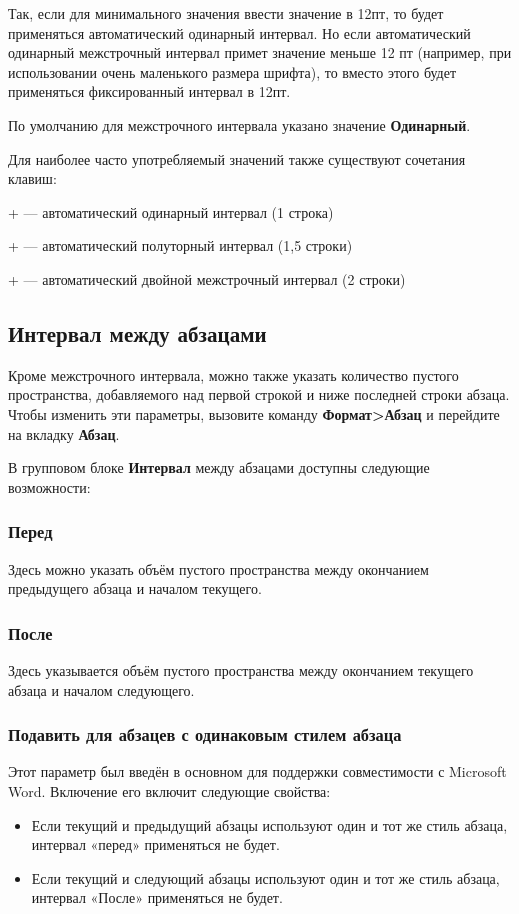 \documentclass[a4paper,10pt]{article}
\begin{document}
\begin{itemize}
Так, если для минимального значения ввести значение в 12пт, то будет применяться автоматический одинарный интервал. Но если автоматический одинарный межстрочный интервал примет значение меньше 12 пт (например, при использовании очень маленького размера шрифта), то вместо этого будет применяться фиксированный интервал в 12пт.
\end{itemize}

По умолчанию для межстрочного интервала указано значение \textbf{Одинарный}.

Для наиболее часто употребляемый значений также существуют сочетания клавиш:

+ --- автоматический одинарный интервал (1 строка)

+ --- автоматический полуторный интервал (1,5 строки)

+ --- автоматический двойной межстрочный интервал (2 строки)

\subsection{Интервал между абзацами}
Кроме межстрочного интервала, можно также указать количество пустого пространства, добавляемого над первой строкой и ниже последней строки абзаца.  
Чтобы изменить эти параметры, вызовите команду \textbf{Формат>Абзац} и перейдите на вкладку \textbf{Абзац}.

В групповом блоке \textbf{Интервал} между абзацами доступны следующие возможности: 

\subsubsection{Перед}
Здесь можно указать объём пустого пространства между окончанием предыдущего абзаца и началом текущего. 

\subsubsection{После}
Здесь указывается объём пустого пространства между окончанием текущего абзаца и началом следующего. 

\subsubsection{Подавить для абзацев с одинаковым стилем абзаца}
Этот параметр был введён в основном для поддержки совместимости с Microsoft Word. Включение его включит следующие свойства:
\begin{itemize}
 \item Если текущий и предыдущий абзацы используют один и тот же стиль абзаца, интервал «перед» применяться не будет.
 \item Если текущий и следующий абзацы используют один и тот же стиль абзаца, интервал «После» применяться не будет.
 \end{itemize}
 
\end{document}

